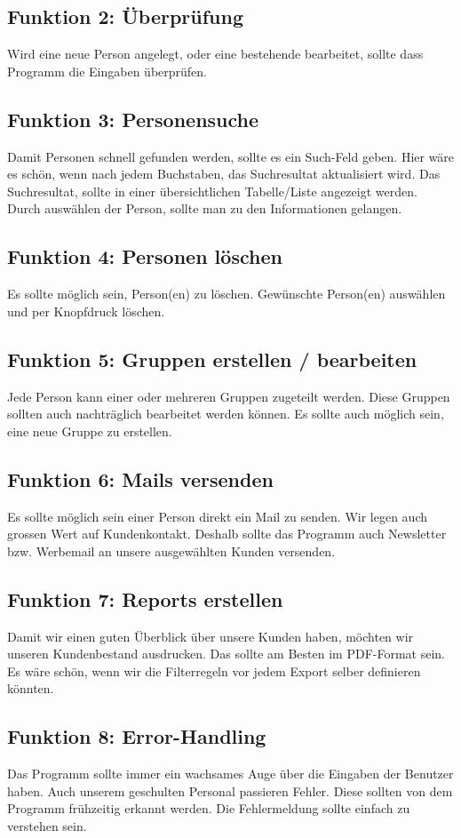 \subsection{Funktion 2: Überprüfung}
Wird eine neue Person angelegt, oder eine bestehende bearbeitet, sollte dass
Programm die Eingaben überprüfen.
\subsection{Funktion 3: Personensuche}
Damit Personen schnell gefunden werden, sollte es ein Such-Feld geben. Hier wäre
es schön, wenn nach jedem Buchstaben, das Suchresultat aktualisiert wird. Das
Suchresultat, sollte in einer übersichtlichen Tabelle/Liste angezeigt werden. Durch
auswählen der Person, sollte man zu den Informationen gelangen.
\subsection{Funktion 4: Personen löschen}
Es sollte möglich sein, Person(en) zu löschen. Gewünschte Person(en) auswählen
und per Knopfdruck löschen.
\subsection{Funktion 5: Gruppen erstellen / bearbeiten}
Jede Person kann einer oder mehreren Gruppen zugeteilt werden. Diese Gruppen
sollten auch nachträglich bearbeitet werden können. Es sollte auch möglich sein,
eine neue Gruppe zu erstellen.
\subsection{Funktion 6: Mails versenden}
Es sollte möglich sein einer Person direkt ein Mail zu senden. Wir legen auch
grossen Wert auf Kundenkontakt. Deshalb sollte das Programm auch Newsletter
bzw. Werbemail an unsere ausgewählten Kunden versenden.
\subsection{Funktion 7: Reports erstellen}
Damit wir einen guten Überblick über unsere Kunden haben, möchten wir unseren
Kundenbestand ausdrucken. Das sollte am Besten im PDF-Format sein. Es wäre
schön, wenn wir die Filterregeln vor jedem Export selber definieren könnten.
\subsection{Funktion 8: Error-Handling}
Das Programm sollte immer ein wachsames Auge über die Eingaben der Benutzer
haben. Auch unserem geschulten Personal passieren Fehler. Diese sollten von dem
Programm frühzeitig erkannt werden. Die Fehlermeldung sollte einfach zu verstehen
sein.
